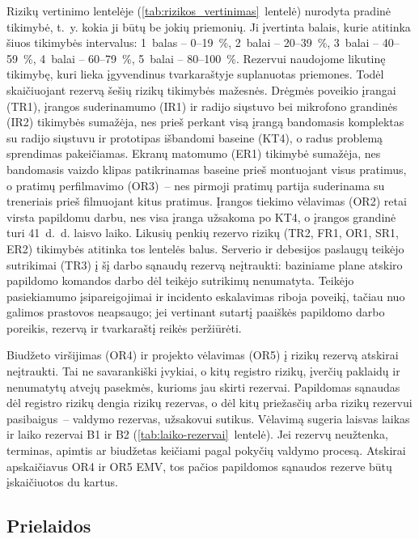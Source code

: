 Rizikų vertinimo lentelėje (\ref{tab:rizikos_vertinimas}~lentelė) nurodyta
pradinė tikimybė, t.~y. kokia ji būtų be jokių priemonių. Ji įvertinta
balais, kurie atitinka šiuos tikimybės intervalus: 1~balas – 0--19~\%, 2~balai –
20--39~\%, 3~balai – 40--59~\%, 4~balai – 60--79~\%, 5~balai –
80--100~\%. Rezervui naudojome likutinę tikimybę, kuri lieka
įgyvendinus tvarkaraštyje suplanuotas priemones. Todėl skaičiuojant rezervą šešių rizikų
tikimybės mažesnės. Drėgmės poveikio įrangai (TR1), įrangos suderinamumo (IR1) ir
radijo siųstuvo bei mikrofono grandinės (IR2) tikimybės sumažėja, nes prieš
perkant visą įrangą bandomasis komplektas su radijo siųstuvu ir prototipas
išbandomi baseine (KT4), o radus problemą sprendimas pakeičiamas.
Ekranų matomumo (ER1) tikimybė sumažėja, nes bandomasis vaizdo klipas
patikrinamas baseine prieš montuojant visus pratimus, o pratimų
perfilmavimo (OR3)~– nes pirmoji pratimų partija suderinama su treneriais
prieš filmuojant kitus pratimus. Įrangos tiekimo vėlavimas (OR2)
retai virsta papildomu darbu, nes visa įranga užsakoma po KT4, o įrangos
grandinė turi 41~d.~d. laisvo laiko. Likusių penkių rezervo rizikų (TR2, FR1, OR1, SR1, ER2)
tikimybės atitinka tos lentelės balus. Serverio ir debesijos paslaugų teikėjo sutrikimai
(TR3) į šį darbo sąnaudų rezervą neįtraukti: baziniame plane atskiro
papildomo komandos darbo dėl teikėjo sutrikimų nenumatyta. Teikėjo
pasiekiamumo įsipareigojimai ir incidento eskalavimas riboja poveikį,
tačiau nuo galimos prastovos neapsaugo; jei vertinant sutartį paaiškės
papildomo darbo poreikis, rezervą ir tvarkaraštį reikės peržiūrėti.

Biudžeto viršijimas (OR4) ir projekto vėlavimas (OR5) į rizikų rezervą
atskirai neįtraukti. Tai ne savarankiški įvykiai, o kitų registro rizikų,
įverčių paklaidų ir nenumatytų atvejų pasekmės, kurioms jau skirti rezervai.
Papildomas sąnaudas dėl registro rizikų dengia rizikų rezervas, o dėl kitų
priežasčių arba rizikų rezervui pasibaigus~– valdymo rezervas, užsakovui
sutikus. Vėlavimą sugeria laisvas laikas ir laiko rezervai B1 ir B2
(\ref{tab:laiko-rezervai}~lentelė). Jei rezervų neužtenka, terminas,
apimtis ar biudžetas keičiami pagal pokyčių valdymo procesą. Atskirai
apskaičiavus OR4 ir OR5 EMV, tos pačios papildomos sąnaudos rezerve būtų
įskaičiuotos du kartus.

\subsection{Prielaidos}

